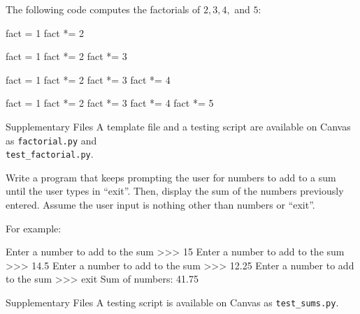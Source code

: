 \documentclass[11pt]{cselabheader}
\begin{document}
{\begin{ex}[factorial.py]
The following code computes the factorials of $2, 3, 4,$ and $5$:

\begin{multicols}{4}
\begin{python3code}
fact = 1
fact *= 2
\end{python3code}
\columnbreak
\begin{python3code}
fact = 1
fact *= 2
fact *= 3
\end{python3code}
\columnbreak
\begin{python3code}
fact = 1
fact *= 2
fact *= 3
fact *= 4
\end{python3code}
\columnbreak
\begin{python3code}
fact = 1
fact *= 2
fact *= 3
fact *= 4
fact *= 5
\end{python3code}
\end{multicols}
\end{ex}

\begin{infobox}{Supplementary Files}
A template file and a testing script are available on Canvas as \texttt{factorial.py} and
\\ %
\texttt{test\_factorial.py}.
\end{infobox}

%
%
%

\begin{ex}[sums.py] Write a program that keeps prompting the user for numbers to
  add to a sum until the user types in ``exit''. Then, display the sum of the
  numbers previously entered. Assume the user input is nothing other than
  numbers or ``exit''.

  For example:

  \begin{verbatimcode}
Enter a number to add to the sum >>> 15
Enter a number to add to the sum >>> 14.5
Enter a number to add to the sum >>> 12.25
Enter a number to add to the sum >>> exit
Sum of numbers: 41.75
  \end{verbatimcode}
\end{ex}
\begin{infobox}{Supplementary Files}
A testing script is available on Canvas as \texttt{test\_sums.py}.
\end{infobox}

}
\end{document}
